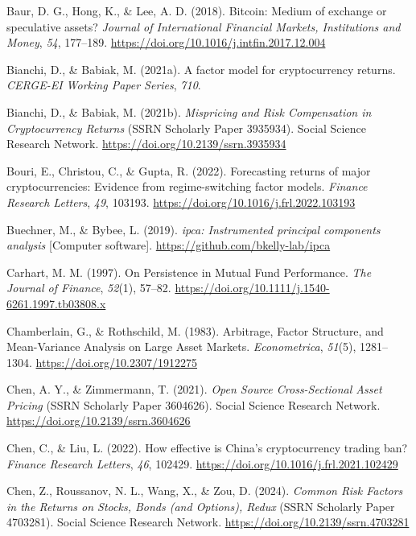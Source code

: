 \documentclass[
  12pt,
  a4paper,
  openany]{scrbook}
\newlength{\cslhangindent}
\newenvironment{CSLReferences}[2] %
 {\begin{list}{}{%
  \setlength{\itemindent}{0pt}
  \setlength{\leftmargin}{0pt}
  \setlength{\parsep}{0pt}
  \ifodd #1
   \setlength{\leftmargin}{\cslhangindent}
   \setlength{\itemindent}{-1\cslhangindent}
  \fi
  \setlength{\itemsep}{#2\baselineskip}}}
 {\end{list}}
\begin{document}
\begin{CSLReferences}{1}{0}
Baur, D. G., Hong, K., \& Lee, A. D. (2018). Bitcoin: Medium of exchange
or speculative assets? \emph{Journal of International Financial Markets,
Institutions and Money}, \emph{54}, 177--189.
\url{https://doi.org/10.1016/j.intfin.2017.12.004}

Bianchi, D., \& Babiak, M. (2021a). A factor model for cryptocurrency
returns. \emph{CERGE-EI Working Paper Series}, \emph{710}.

Bianchi, D., \& Babiak, M. (2021b). \emph{Mispricing and Risk
Compensation in Cryptocurrency Returns} (SSRN Scholarly Paper 3935934).
Social Science Research Network.
\url{https://doi.org/10.2139/ssrn.3935934}

Bouri, E., Christou, C., \& Gupta, R. (2022). Forecasting returns of
major cryptocurrencies: Evidence from regime-switching factor models.
\emph{Finance Research Letters}, \emph{49}, 103193.
\url{https://doi.org/10.1016/j.frl.2022.103193}

Buechner, M., \& Bybee, L. (2019). \emph{{ipca}: Instrumented principal
components analysis} {[}Computer software{]}.
\url{https://github.com/bkelly-lab/ipca}

Carhart, M. M. (1997). On Persistence in Mutual Fund Performance.
\emph{The Journal of Finance}, \emph{52}(1), 57--82.
\url{https://doi.org/10.1111/j.1540-6261.1997.tb03808.x}

Chamberlain, G., \& Rothschild, M. (1983). Arbitrage, Factor Structure,
and Mean-Variance Analysis on Large Asset Markets. \emph{Econometrica},
\emph{51}(5), 1281--1304. \url{https://doi.org/10.2307/1912275}

Chen, A. Y., \& Zimmermann, T. (2021). \emph{Open Source Cross-Sectional
Asset Pricing} (SSRN Scholarly Paper 3604626). Social Science Research
Network. \url{https://doi.org/10.2139/ssrn.3604626}

Chen, C., \& Liu, L. (2022). How effective is China's cryptocurrency
trading ban? \emph{Finance Research Letters}, \emph{46}, 102429.
\url{https://doi.org/10.1016/j.frl.2021.102429}

Chen, Z., Roussanov, N. L., Wang, X., \& Zou, D. (2024). \emph{Common
Risk Factors in the Returns on Stocks, Bonds (and Options), Redux} (SSRN
Scholarly Paper 4703281). Social Science Research Network.
\url{https://doi.org/10.2139/ssrn.4703281}


\end{CSLReferences}
\end{document}
